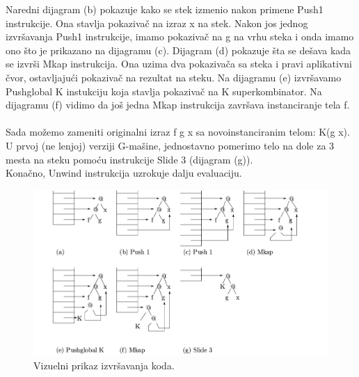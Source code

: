 Naredni dijagram (b) pokazuje kako se stek izmenio nakon primene Push1 instrukcije. Ona stavlja pokazivač na izraz x na stek. Nakon jos jednog izvršavanja Push1 instrukcije, imamo pokazivač na g na vrhu steka i onda imamo ono što je prikazano na dijagramu (c). Dijagram (d) pokazuje šta se dešava kada se izvrši Mkap instrukcija. Ona uzima dva pokazivača sa steka i pravi aplikativni čvor, ostavljajući pokazivač na rezultat na steku. Na dijagramu (e) izvršavamo Pushglobal K instukciju koja stavlja pokazivač na K superkombinator. Na dijagramu (f) vidimo da još jedna Mkap instrukcija završava instanciranje tela f.\\ 
\\
Sada možemo zameniti originalni izraz f g x  sa novoinstanciranim telom: K(g x). U prvoj (ne lenjoj) verziji G-mašine, jednostavno pomerimo telo na dole za 3 mesta na steku pomoću instrukcije Slide 3 (dijagram (g)).\\ Konačno, Unwind instrukcija uzrokuje dalju evaluaciju.\\
\begin{figure}[h!]
\begin{center}
\includegraphics[scale=0.35]{primerGmasine.png}
\end{center}
\caption{Vizuelni prikaz izvršavanja koda.}
\label{fig:primerGmasine}
\end{figure}


